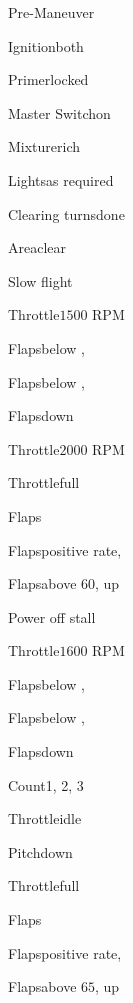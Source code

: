 





\begin{multicols}{2}
\begin{checklist}{Pre-Maneuver}
    \item{Ignition}{both}
    \item{Primer}{locked}
    \item{Master Switch}{on}
    \item{Mixture}{rich}
    \item{Lights}{as required}
    \item{Clearing turns}{done}
    \item{Area}{clear}
\end{checklist}

\begin{checklist}{Slow flight}
  \item{Throttle}{$1500$ RPM}
  \item{Flaps}{below \vfe, \flapsfirstnotch}
  \item{Flaps}{below \vfe, \flapssecondnotch}
  \item{Flaps}{down}
  \item{Throttle}{$2000$ RPM}
  \item{Throttle}{full}
  \item{Flaps}{\flapssecondnotch}
  \item{Flaps}{positive rate, \flapsfirstnotch}
  \item{Flaps}{above 60, up}
\end{checklist}

\begin{checklist}{Power off stall}
  \item{Throttle}{$1600$ RPM}
  \item{Flaps}{below \vfe, \flapsfirstnotch}
  \item{Flaps}{below \vfe, \flapssecondnotch}
  \item{Flaps}{down}
  \item{Count}{1, 2, 3}
  \item{Throttle}{idle}
  \item{Pitch}{down}
  \item{Throttle}{full}
  \item{Flaps}{\flapssecondnotch}
  \item{Flaps}{positive rate, \flapsfirstnotch}
  \item{Flaps}{above $65$, up}
\end{checklist}


\end{multicols}
